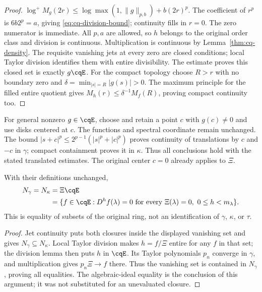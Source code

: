 \begin{proof}
$\log^+M_g(2r)\leq\log\max(1,\|g\|_{p,b})+b(2r)^p$.
The coefficient of $r^p$ is $6b2^p=a$, giving
\eqref{eq:cq-division-bound}; continuity fills in $r=0$.
The zero numerator is immediate. All $p,a$ are allowed, so $h$
belongs to the original order class and division is continuous.
Multiplication is continuous by Lemma~\ref{thm:cq-density}.
The requisite vanishing jets at every zero are closed conditions;
local Taylor division identifies them with entire divisibility.
The estimate proves this closed set is exactly $g\cqE$.
For the compact topology choose $R>r$ with no boundary zero and
$\delta=\min_{|s|=R}|g(s)|>0$. The maximum principle for the filled
entire quotient gives $M_h(r)\leq\delta^{-1}M_f(R)$, proving
compact continuity too.
\end{proof}

For general nonzero $g\in\cqE$, choose and retain a point $c$ with
$g(c)\ne0$ and use disks centered at $c$. The functions and spectral
coordinate remain unchanged. The bound
$|s+c|^p\leq2^{p-1}(|s|^p+|c|^p)$ proves continuity of translations
by $c$ and $-c$ in $\gamma$; compact containment proves it in
$\kappa$. Thus all conclusions hold with the stated translated
estimates. The original center $c=0$ already applies to $\Xi$.

\begin{cqproposition}
\label{thm:cq-equalclosures}
With their definitions unchanged,
\begin{equation}\label{eq:cq-equalclosures}
 \begin{aligned}
 N_\gamma=N_\kappa&=\Xi\cqE\\
 &=\{f\in\cqE:D^hf(\lambda)=0\text{ for every }\Xi(\lambda)=0,
                                      \ 0\leq h<m_\lambda\}.
 \end{aligned}
\end{equation}
This is equality of subsets of the original ring, not an
identification of $\gamma$, $\kappa$, or $\tau$.
\end{cqproposition}
\begin{proof}
Jet continuity puts both closures inside the displayed vanishing
set and gives $N_\gamma\subseteq N_\kappa$. Local Taylor division
makes $h=f/\Xi$ entire for any $f$ in that set; the division lemma
then puts $h$ in $\cqE$. Its Taylor polynomials $p_n$ converge in
$\gamma$, and multiplication gives $p_n\Xi\to f$ there. Thus the
vanishing set is contained in $N_\gamma$, proving all equalities.
The algebraic-ideal equality is the conclusion of this argument;
it was not substituted for an unevaluated closure.
\end{proof}

